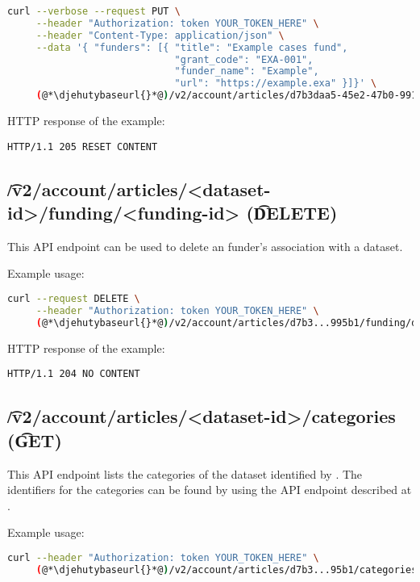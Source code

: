 \begin{lstlisting}[language=bash]
curl --verbose --request PUT \
     --header "Authorization: token YOUR_TOKEN_HERE" \
     --header "Content-Type: application/json" \
     --data '{ "funders": [{ "title": "Example cases fund",
                             "grant_code": "EXA-001",
                             "funder_name": "Example",
                             "url": "https://example.exa" }]}' \
     (@*\djehutybaseurl{}*@)/v2/account/articles/d7b3daa5-45e2-47b0-9910-0f7fa6a995b1/funding
\end{lstlisting}

  HTTP response of the example:
\begin{lstlisting}
HTTP/1.1 205 RESET CONTENT
\end{lstlisting}

\subsection{\t{/v2/account/articles/<dataset-id>/funding/<funding-id>} (\t{DELETE})}

  This API endpoint can be used to delete an funder's association with a dataset.

  Example usage:
\begin{lstlisting}[language=bash]
curl --request DELETE \
     --header "Authorization: token YOUR_TOKEN_HERE" \
     (@*\djehutybaseurl{}*@)/v2/account/articles/d7b3...995b1/funding/d50e...7500
\end{lstlisting}

  HTTP response of the example:
\begin{lstlisting}
HTTP/1.1 204 NO CONTENT
\end{lstlisting}

\subsection{\t{/v2/account/articles/<dataset-id>/categories} (\t{GET})}
\label{sec:api-v2-articles-categories-get}

  This API endpoint lists the categories of the dataset identified by .
  The identifiers for the categories can be found by using the API endpoint
  described at .

  Example usage:
\begin{lstlisting}[language=bash]
curl --header "Authorization: token YOUR_TOKEN_HERE" \
     (@*\djehutybaseurl{}*@)/v2/account/articles/d7b3...95b1/categories | jq
\end{lstlisting}

